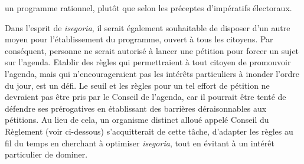 un programme rationnel, plutôt que selon les préceptes d'impératifs
électoraux.\par
Dans l'esprit de \emph{isegoria}, il serait également souhaitable de disposer
d'un autre moyen pour l'établissement du programme, ouvert à tous les
citoyens. Par conséquent, personne ne serait autorisé à lancer une
pétition pour forcer un sujet sur l'agenda. Etablir des règles
qui permettraient à tout citoyen de promouvoir l'agenda, mais
qui n'encourageraient pas les intérêts particuliers à inonder l'ordre du
jour, est un défi. Le seuil et les règles pour un tel effort de
pétition ne devraient pas être pris par le Conseil de l'agenda,
car il pourrait être tenté de défendre ses prérogatives en établissant
des barrières déraisonnables aux pétitions. Au lieu de cela, un
organisme distinct alloué appelé Conseil du Règlement (voir
ci-dessous) s'acquitterait de cette tâche, d'adapter les règles au fil
du temps en cherchant à optimiser \emph{isegoria}, tout en évitant à un intérêt
particulier de dominer.\par
